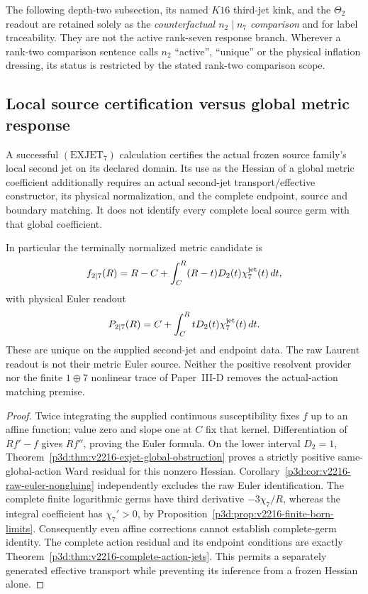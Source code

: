 \documentclass[12pt,a4paper]{article}
\begin{document}
\begin{remark}
The following depth-two subsection, its named $K16$ third-jet
kink, and the $\Theta_2$ readout are retained solely as the
\emph{counterfactual $n_2\mid n_7$ comparison} and for label
traceability.  They are not the active rank-seven response branch.  Wherever
a rank-two comparison sentence calls $n_2$ ``active'', ``unique'' or the physical
inflation dressing, its status is restricted by the stated rank-two comparison scope.
\end{remark}


\subsection{Local source certification versus global metric response}
\label{p3e:sec:v204-local-global-response}
\begin{corollary}
\label{p3e:cor:v2216-local-global-response-scope}
A successful $(\mathrm{EXJET}_7)$ calculation certifies the actual frozen
source family's local second jet on its declared domain. Its use as the
Hessian of a global metric coefficient additionally requires an actual
second-jet transport/effective constructor, its physical normalization,
and the complete endpoint, source and boundary matching. It does not
identify every complete local source germ with that global coefficient.

In particular the terminally normalized metric candidate is
\[
 f_{2\mid7}(R)=R-C+\int_C^R(R-t)D_2(t)\chi_7^{\rm jet}(t)\,dt,
\]
with physical Euler readout
\[
 P_{2\mid7}(R)=C+\int_C^R tD_2(t)\chi_7^{\rm jet}(t)\,dt.
\]
These are unique on the supplied second-jet and endpoint data. The raw
Laurent readout is not their metric Euler source. Neither the positive
resolvent provider nor the finite $1\oplus7$ nonlinear trace of Paper~III-D
removes the actual-action matching premise.
\end{corollary}
\begin{proof}
Twice integrating the supplied continuous susceptibility fixes $f$ up to
an affine function; value zero and slope one at $C$ fix that kernel.
Differentiation of $Rf'-f$ gives $Rf''$, proving the Euler formula.
On the lower interval $D_2=1$,
Theorem~\ref{p3d:thm:v2216-exjet-global-obstruction} proves a strictly
positive same-global-action Ward residual for this nonzero Hessian.
Corollary~\ref{p3d:cor:v2216-raw-euler-nongluing} independently excludes
the raw Euler identification. The complete finite logarithmic germs have
third derivative $-3\chi_7/R$, whereas the integral coefficient has
$\chi_7'>0$, by Proposition~\ref{p3d:prop:v2216-finite-born-limits}.
Consequently even affine corrections cannot establish complete-germ
identity. The complete action residual and its endpoint conditions are
exactly Theorem~\ref{p3d:thm:v2216-complete-action-jets}. This permits a
separately generated effective transport while preventing its inference
from a frozen Hessian alone.
\end{proof}
\end{document}
